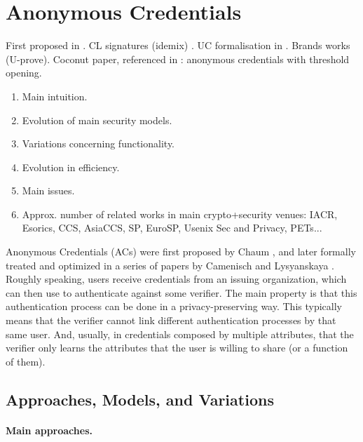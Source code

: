 \section{Anonymous Credentials}
\label{sec:ac}

First proposed in \cite{chau85}.
CL signatures (idemix) \cite{cl01,cl04}.
UC formalisation in \cite{cdhk15}.
Brands works (U-prove).
Coconut paper, referenced in \cite[Section 1]{cdl+20}: anonymous credentials with
threshold opening.

\begin{enumerate}
\item Main intuition.
\item Evolution of main security models.
\item Variations concerning functionality.
\item Evolution in efficiency.
\item Main issues.
\item Approx. number of related works in main crypto+security venues: IACR,
  Esorics, CCS, AsiaCCS, SP, EuroSP, Usenix Sec and Privacy, PETs...
\end{enumerate}

Anonymous Credentials (ACs) were first proposed by Chaum \cite{chau85}, and
later formally treated and optimized in a series of papers by Camenisch and
Lysyanskaya \cite{cl01,cl02,cl04}. Roughly speaking, users receive credentials
from an issuing organization, which can then use to authenticate against some
verifier. The main property is that this authentication process can be done
in a privacy-preserving way. This typically means that the verifier cannot
link different authentication processes by that same user. And, usually, in
credentials composed by multiple attributes, that the verifier only learns
the attributes that the user is willing to share (or a function of them).

\subsection{Approaches, Models, and Variations}

\paragraph{Main approaches.} %

